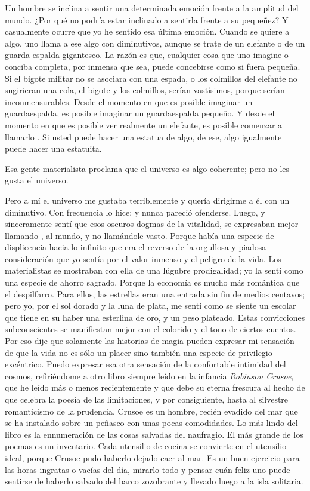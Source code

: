 Un hombre se inclina a sentir una determinada emoción frente a la amplitud del mundo. ¿Por qué no
podría estar inclinado a sentirla frente a su pequeñez? Y casualmente ocurre que yo he sentido esa última
emoción. Cuando se quiere a algo, uno llama a ese algo con diminutivos, aunque se trate de un elefante o
de un guarda espalda gigantesco. La razón es que, cualquier cosa que uno imagine o conciba completa,
por inmensa que sea, puede concebirse como si fuera pequeña. Si el bigote militar no se asociara con una
espada, o los colmillos del elefante no sugirieran una cola, el bigote y los colmillos, serían vastísimos,
porque serían inconmensurables. Desde el momento en que es posible imaginar un guardaespalda, es
posible imaginar un guardaespalda pequeño. Y desde el momento en que es posible ver realmente un
elefante, es posible comenzar a llamarlo . Si usted puede hacer una estatua de algo, de ese, algo
igualmente puede hacer una estatuita.

Esa gente materialista proclama que el universo es algo coherente; pero no les gusta el universo.

Pero a mí el universo me gustaba terriblemente y quería dirigirme a él con un diminutivo. Con frecuencia
lo hice; y nunca pareció ofenderse. Luego, y sinceramente sentí que esos oscuros dogmas de la vitalidad,
se expresaban mejor llamando , al mundo, y no llamándole vasto. Porque había una especie de
displicencia hacia lo infinito que era el reverso de la orgullosa y piadosa consideración que yo sentía por
el valor inmenso y el peligro de la vida. Los materialistas se mostraban con ella de una lúgubre
prodigalidad; yo la sentí como una especie de ahorro sagrado. Porque la economía es mucho más
romántica que el despilfarro. Para ellos, las estrellas eran una entrada sin fin de medios centavos; pero yo,
por el sol dorado y la luna de plata, me sentí como se siente un escolar que tiene en su haber una esterlina
de oro, y un peso plateado. Estas convicciones subconscientes se manifiestan mejor con el colorido y el
tono de ciertos cuentos. Por eso dije que solamente las historias de magia pueden expresar mi sensación
de que la vida no es sólo un placer sino también una especie de privilegio excéntrico. Puedo expresar esa
otra sensación de la confortable intimidad del cosmos, refiriéndome a otro libro siempre leído en la
infancia \emph{Robinson Crusoe}, que he leído más o menos recientemente y que debe su eterna frescura al
hecho de que celebra la poesía de las limitaciones, y por consiguiente, hasta al silvestre romanticismo de
la prudencia. Crusoe es un hombre, recién evadido del mar que se ha instalado sobre un peñasco con unas
pocas comodidades. Lo más lindo del libro es la ennumeración de las cosas salvadas del naufragio. El
más grande de los poemas es un inventario. Cada utensilio de cocina se convierte en el utensilio ideal,
porque Crusoe pudo haberlo dejado caer al mar. Es un buen ejercicio para las horas ingratas o vacías del
día, mirarlo todo y pensar cuán feliz uno puede sentirse de haberlo salvado del barco zozobrante y llevado
luego a la isla solitaria.

